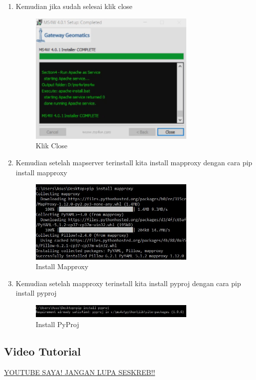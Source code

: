 \begin{enumerate}
	\item Kemudian jika sudah selesai klik close
    \hfill\break
	\begin{figure}[H]
		\includegraphics[width=8cm]{figures/1174034/1174034/5.PNG}
		\centering
		\caption{Klik Close}
	\end{figure}

    \item Kemudian setelah mapserver terinstall kita install mapproxy dengan cara pip install mapproxy
    \hfill\break
	\begin{figure}[H]
		\includegraphics[width=8cm]{figures/1174034/1174034/6.PNG}
		\centering
		\caption{Install Mapproxy}
	\end{figure}

	\item Kemudian setelah mapproxy terinstall kita install pyproj dengan cara pip install pyproj
    \hfill\break
	\begin{figure}[H]
		\includegraphics[width=8cm]{figures/1174034/1174034/7.PNG}
		\centering
		\caption{Install PyProj}
	\end{figure}
\end{enumerate}

\subsection{Video Tutorial}
\href{https://youtu.be/ruwaHMJp-iE}{YOUTUBE SAYA! JANGAN LUPA SESKREB!!}